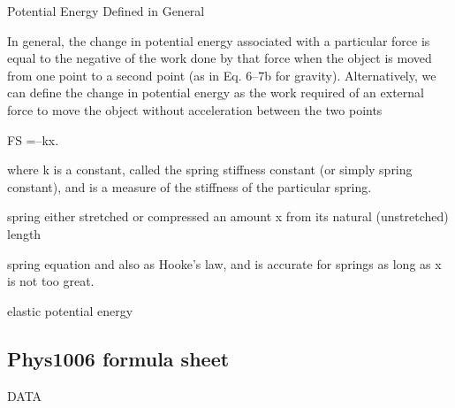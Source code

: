 \documentclass{extarticle}
\begin{document}
\markStart[100]










Potential Energy Defined in General

In general, the change in potential energy
associated with a particular force is equal to the negative of the work done by
that force when the object is moved from one point to a second point (as in Eq. 6–7b
for gravity). Alternatively, we can define the change in potential energy as the
work required of an external force to move the object without acceleration between
the two points


















FS =–kx.

where k is a constant, called the spring stiffness constant (or simply spring constant),
and is a measure of the stiffness of the particular spring.

spring either
stretched or compressed an amount x from its natural (unstretched) length


spring equation and
also as Hooke’s law, and is accurate for springs as long as x is not too great.





elastic potential energy




\markEnd








\subsection{Phys1006 formula sheet}



\markStart[100]

DATA
\end{document}

